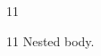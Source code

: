 \documentclass[paper=A4]{ropas-poster}
\begin{document}
\begin{postergrid}{1}{1}
\begin{posterblock}{1}{1}
Nested body.
\end{posterblock}
\end{postergrid}
\end{document}
